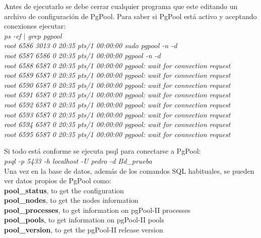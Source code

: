 Antes de ejecutarlo se debe cerrar cualquier programa que este editando un archivo de configuración de PgPool. Para saber si PgPool está activo y aceptando conexiones ejecutar:\\

\emph{ps -ef $|$ grep pgpool}\\

\emph{root      6586  3013  0 20:35 pts/1    00:00:00 sudo pgpool -n -d\\
root      6587  6586  0 20:35 pts/1    00:00:00 pgpool -n -d\\
root      6588  6587  0 20:35 pts/1    00:00:00 pgpool: wait for connection request\\
root      6589  6587  0 20:35 pts/1    00:00:00 pgpool: wait for connection request\\
root      6590  6587  0 20:35 pts/1    00:00:00 pgpool: wait for connection request\\
root      6591  6587  0 20:35 pts/1    00:00:00 pgpool: wait for connection request\\
root      6592  6587  0 20:35 pts/1    00:00:00 pgpool: wait for connection request\\
root      6593  6587  0 20:35 pts/1    00:00:00 pgpool: wait for connection request\\
root      6594  6587  0 20:35 pts/1    00:00:00 pgpool: wait for connection request\\
root      6595  6587  0 20:35 pts/1    00:00:00 pgpool: wait for connection request\\}

Si todo está conforme se ejecuta psql para conectarse a PgPool:\\

\emph{psql -p 5433 -h localhost -U pedro -d Bd\_prueba}\\

Una vez en la base de datos, además de los comandos SQL habituales, se pueden ver datos propios de PgPool como:\\

\textbf{pool\_status}, to get the configuration\\
\textbf{pool\_nodes}, to get the nodes information\\
\textbf{pool\_processes}, to get information on pgPool-II processes\\
\textbf{pool\_pools}, to get information on pgPool-II pools\\
\textbf{pool\_version}, to get the pgPool-II release version\\
 






